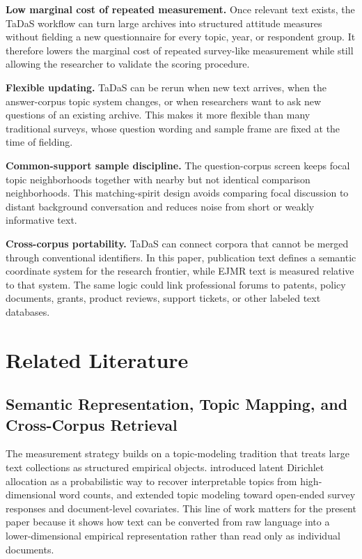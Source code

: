 \documentclass[11pt]{article}
\begin{document}
\textbf{Low marginal cost of repeated measurement.} Once relevant text exists, the TaDaS workflow can turn large archives into structured attitude measures without fielding a new questionnaire for every topic, year, or respondent group. It therefore lowers the marginal cost of repeated survey-like measurement while still allowing the researcher to validate the scoring procedure.

\textbf{Flexible updating.} TaDaS can be rerun when new text arrives, when the answer-corpus topic system changes, or when researchers want to ask new questions of an existing archive. This makes it more flexible than many traditional surveys, whose question wording and sample frame are fixed at the time of fielding.

\textbf{Common-support sample discipline.} The question-corpus screen keeps focal topic neighborhoods together with nearby but not identical comparison neighborhoods. This matching-spirit design avoids comparing focal discussion to distant background conversation and reduces noise from short or weakly informative text.

\textbf{Cross-corpus portability.} TaDaS can connect corpora that cannot be merged through conventional identifiers. In this paper, publication text defines a semantic coordinate system for the research frontier, while EJMR text is measured relative to that system. The same logic could link professional forums to patents, policy documents, grants, product reviews, support tickets, or other labeled text databases.

\section{Related Literature}
\label{sec:literature}

\subsection{Semantic Representation, Topic Mapping, and Cross-Corpus Retrieval}

The measurement strategy builds on a topic-modeling tradition that treats large text collections as structured empirical objects. \citet{blei2003} introduced latent Dirichlet allocation as a probabilistic way to recover interpretable topics from high-dimensional word counts, and \citet{roberts2014} extended topic modeling toward open-ended survey responses and document-level covariates. This line of work matters for the present paper because it shows how text can be converted from raw language into a lower-dimensional empirical representation rather than read only as individual documents.
\end{document}
